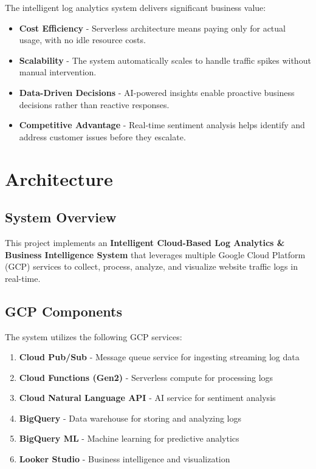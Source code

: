 \documentclass[12pt,a4paper]{article}
\begin{document}
The intelligent log analytics system delivers significant business value:

\begin{itemize}
    \item \textbf{Cost Efficiency} - Serverless architecture means paying only for actual usage, with no idle resource costs.
    \item \textbf{Scalability} - The system automatically scales to handle traffic spikes without manual intervention.
    \item \textbf{Data-Driven Decisions} - AI-powered insights enable proactive business decisions rather than reactive responses.
    \item \textbf{Competitive Advantage} - Real-time sentiment analysis helps identify and address customer issues before they escalate.
\end{itemize}

\section{Architecture}

\subsection{System Overview}

This project implements an \textbf{Intelligent Cloud-Based Log Analytics \& Business Intelligence System} that leverages multiple Google Cloud Platform (GCP) services to collect, process, analyze, and visualize website traffic logs in real-time.

\subsection{GCP Components}

The system utilizes the following GCP services:

\begin{enumerate}[label=\arabic*.]
    \item \textbf{Cloud Pub/Sub} - Message queue service for ingesting streaming log data
    \item \textbf{Cloud Functions (Gen2)} - Serverless compute for processing logs
    \item \textbf{Cloud Natural Language API} - AI service for sentiment analysis
    \item \textbf{BigQuery} - Data warehouse for storing and analyzing logs
    \item \textbf{BigQuery ML} - Machine learning for predictive analytics
    \item \textbf{Looker Studio} - Business intelligence and visualization
\end{enumerate}
\end{document}
